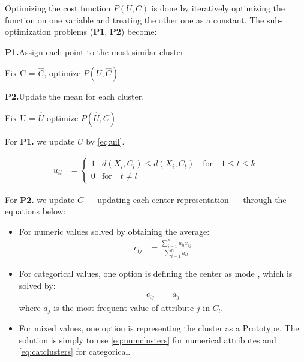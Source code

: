 \documentclass[../report.tex]{subfiles}
\begin{document}
Optimizing the cost function $P(U,C)$ is done by iteratively optimizing the function on one variable and treating the other one as a constant. The sub-optimization problems (\textbf{P1}, \textbf{P2}) become:

\begin{description}
  \item \textbf{P1.}\quad Assign each point to the most similar cluster.
    \begin{description}
    	\item Fix C = $\hat{C}$, optimize $P(U, \hat{ C })$
    \end{description}

  \item \textbf{P2.}\quad Update the mean for each cluster.
    \begin{description}
		\item Fix U = $\hat{U}$ optimize $P(\hat{ U },C)$
    \end{description}
\end{description}

For \textbf{P1.} we update $U$ by \cref{eq:uil}.

\begin{align}
 \label{eq:uil}
  u_{il} &=
  \begin{cases}
  1 & d(X_i,C_l) \leq d(X_i,C_t) \quad \text{for} \quad 1 \leq t \leq k \\
  0 & \text{for} \quad t \neq l
  \end{cases}
\end{align}

For \textbf{P2.} we update $C$ --- updating each center representation --- through the equations below:

\begin{itemize}
    \item For numeric values solved by obtaining the average:
      \begin{align}
        \label{eq:numclusters}
        c_{lj} &= \frac{ \sum_{i = 1}^{n}{ u_{ il }x_{ ij }  }}{\sum_{i = 1}^{n}{ u_{ il }}}
      \end{align}
    \item For categorical values, one option is defining the center as mode \cite{Ng1999}, which is solved by:
      \begin{align}
        \label{eq:catclusters}
      c_{lj} &= a_{j}
      \end{align}
      where $a_{j}$ is the most frequent value of attribute $j$ in $C_l$.
    \item For mixed values, one option is representing the cluster as a Prototype\cite{Huang97clusteringlarge,Huang1998}. The solution is simply to use \cref{eq:numclusters} for numerical attributes and \cref{eq:catclusters} for categorical.
\end{itemize}
\end{document}

